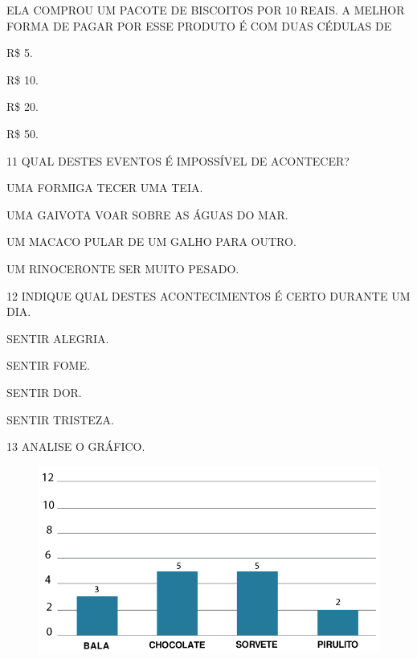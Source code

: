 ELA COMPROU UM PACOTE DE BISCOITOS POR 10 REAIS. A MELHOR
FORMA DE PAGAR POR ESSE PRODUTO É COM DUAS CÉDULAS DE

\begin{multicols}{2}
\begin{escolha}
\item R\$ 5.

\item R\$ 10.

\item R\$ 20.

\item R\$ 50.
\end{escolha}
\end{multicols}

\vspace{0.5cm}

\num{11} QUAL DESTES EVENTOS É IMPOSSÍVEL DE ACONTECER?

\begin{escolha}
\item UMA FORMIGA TECER UMA TEIA.

\item UMA GAIVOTA VOAR SOBRE AS ÁGUAS DO MAR.

\item UM MACACO PULAR DE UM GALHO PARA OUTRO.

\item UM RINOCERONTE SER MUITO PESADO.
\end{escolha}

\num{12} INDIQUE QUAL DESTES ACONTECIMENTOS É CERTO DURANTE UM DIA.

\begin{escolha}
\item SENTIR ALEGRIA.

\item SENTIR FOME.

\item SENTIR DOR.

\item SENTIR TRISTEZA.
\end{escolha}

\num{13} ANALISE O GRÁFICO.

\begin{figure}[H]
\includegraphics[width=\textwidth]{./media/SAEB_1ANO_MAT_FIGURA118.png}
\end{figure}

